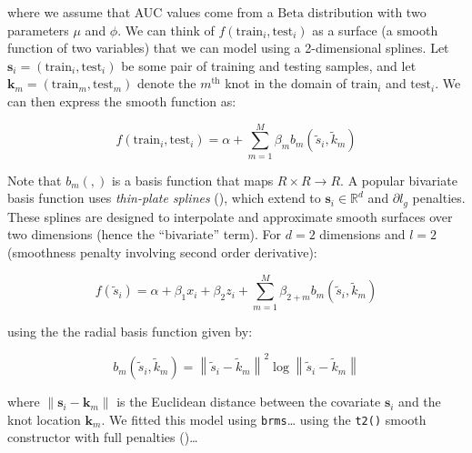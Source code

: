 \documentclass[
  doc,
  floatsintext,
  longtable,
  a4paper,
  nolmodern,
  notxfonts,
  notimes,
  donotrepeattitle,
  colorlinks=true,linkcolor=blue,citecolor=blue,urlcolor=blue]{apa7}
\begin{document}
where we assume that AUC values come from a \(\mathrm{Beta}\)
distribution with two parameters \(\mu\) and \(\phi\). We can think of
\(f \left(\text{train}_{i}, \text{test}_{i} \right)\) as a surface (a
smooth function of two variables) that we can model using a
2-dimensional splines. Let
\(\mathbf{s}_{i} = \left(\text{train}_{i}, \text{test}_{i} \right)\) be
some pair of training and testing samples, and let
\(\mathbf{k}_{m} = \left(\text{train}_{m}, \text{test}_{m} \right)\)
denote the \(m^{\text{th}}\) knot in the domain of \(\text{train}_{i}\)
and \(\text{test}_{i}\). We can then express the smooth function as:

\[
f \left(\text{train}_{i}, \text{test}_{i} \right) = \alpha + \sum_{m=1}^M \beta_{m} b_{m} \left(\tilde{s}_{i}, \tilde{k}_{m} \right)
\]

Note that \(b_{m}(,)\) is a basis function that maps
\(R \times R \rightarrow R\). A popular bivariate basis function uses
\emph{thin-plate splines} (), which
extend to \(\mathbf{s}_{i} \in \mathbb{R}^{d}\) and \(\partial l_{g}\)
penalties. These splines are designed to interpolate and approximate
smooth surfaces over two dimensions (hence the ``bivariate'' term). For
\(d=2\) dimensions and \(l=2\) (smoothness penalty involving second
order derivative):

\[
f \left(\tilde{s}_{i} \right) = \alpha + \beta_{1} x_{i} + \beta_{2} z_{i} +\sum_{m=1}^{M} \beta_{2+m} b_m\left(\tilde{s}_i, \tilde{k}_m\right)
\]

using the the radial basis function given by:

\[
b_m\left(\tilde{s}_i, \tilde{k}_m\right)=\left\|\tilde{s}_i-\tilde{k}_m\right\|^2 \log \left\|\tilde{s}_i-\tilde{k}_m\right\|
\]

where \(\left\|\mathbf{s}_i-\mathbf{k}_{m}\right\|\) is the Euclidean
distance between the covariate \(\mathbf{s}_{i}\) and the knot location
\(\mathbf{k}_{m}\). We fitted this model using \texttt{brms}\ldots{}
using the \texttt{t2()} smooth constructor with full penalties
()\ldots{}
\end{document}
